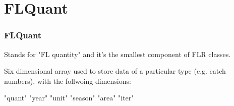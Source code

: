 \documentclass{beamer}%
\begin{document}
\section{FLQuant}
\begin{frame}[containsverbatim]
  \frametitle{FLQuant}

Stands for "FL quantity" and it's the smallest component of FLR classes.\newline 

Six dimensional array used to store data of a particular type (e.g. catch numbers), with the follwoing dimensions:\newline

{\scriptsize{
\begin{Schunk}
\begin{Soutput}
[1] "quant"  "year"   "unit"   "season" "area"   "iter"  
\end{Soutput}
\end{Schunk}
}}


\end{frame}

\end{document}

